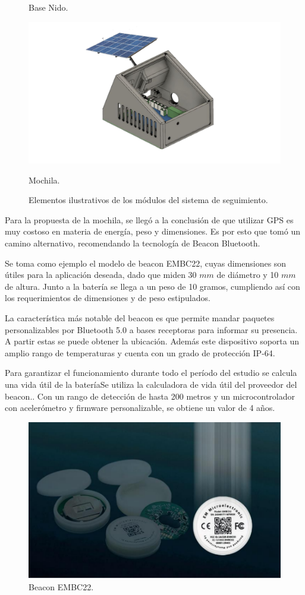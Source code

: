 \begin{figure}[H]
    	\caption{Base Nido.}
    	\label{fact:nido}
    \endminipage\hfill
    	\centering
    	\includegraphics[width=\linewidth,page=4]{ImagenesFactibilidad/beacon}
    	\caption{Mochila.}
	\label{fact:beacon}
    \endminipage
	\caption{Elementos ilustrativos de los módulos del sistema de seguimiento.}
	\label{fig:componentes_beacon_ilustrativo}
\end{figure}

Para la propuesta de la mochila, se llegó a la conclusión de que utilizar GPS es muy costoso en materia de energía, peso y dimensiones. Es por esto que tomó un camino alternativo, recomendando la tecnología de Beacon Bluetooth.

Se toma como ejemplo el modelo de beacon EMBC22, cuyas dimensiones son útiles para la aplicación deseada, dado que miden 30 $mm$ de diámetro y 10 $mm$ de altura. Junto a la batería se llega a un peso de 10 gramos, cumpliendo así con los requerimientos de dimensiones y de peso estipulados.

La característica más notable del beacon es que permite mandar paquetes personalizables por Bluetooth 5.0 a bases receptoras para informar su presencia. A partir estas se puede obtener la ubicación. Además este dispositivo soporta un amplio rango de temperaturas y cuenta con un grado de protección IP-64.

Para garantizar el funcionamiento durante todo el período del estudio se calcula una vida útil de la batería{Se utiliza la calculadora de vida útil del proveedor del beacon.}. Con un rango de detección de hasta 200 metros y un microcontrolador con acelerómetro y firmware personalizable, se obtiene un valor de 4 años.
\begin{figure}[H]
	\centering
	\includegraphics[width=0.7\linewidth]{ImagenesFactibilidad/beaconpic}
	\caption{Beacon EMBC22.}
	\label{fig:beacon}
\end{figure}

